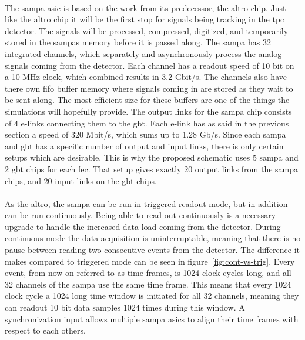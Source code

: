 \documentclass[a4paper]{report}
\begin{document}
\paragraph{}
The \gls{sampa} \gls{asic} is based on the work from its predecessor, the \gls{altro} chip.
Just like the \gls{altro} chip it will be the first stop for signals being tracking in the \gls{tpc} detector.
The signals will be processed, compressed, digitized, and temporarily stored in the \glspl{sampa} memory before it is passed along.
The \gls{sampa} has 32 integrated channels, which separately and asynchronously process the analog signals coming from the detector.\cite{tdr-016}
Each channel has a readout speed of 10 bit on a 10 MHz clock, which combined results in 3.2 Gbit/s.
The channels also have there own \gls{fifo} buffer memory where signals coming in are stored as they wait to be sent along.
The most efficient size for these buffers are one of the things the simulations will hopefully provide.
The output links for the \gls{sampa} chip consists of 4 e-links connecting them to the \gls{gbt}.
Each e-link has as said in the previous section a speed of 320 Mbit/s, which sums up to 1.28 Gb/s.\cite{tdr-015}
Since each \gls{sampa} and \gls{gbt} has a specific number of output and input links, there is only certain setups which are desirable.
This is why the proposed schematic uses 5 \gls{sampa} and 2 \gls{gbt} chips for each \gls{fec}.
That setup gives exactly 20 output links from the \gls{sampa} chips, and 20 input links on the \gls{gbt} chips.

\paragraph{}
As the \gls{altro}, the \gls{sampa} can be run in triggered readout mode, but in addition can be run continuously.
Being able to read out continuously is a necessary upgrade to handle the increased data load coming from the detector.
During continuous mode the data acquisition is uninterruptable, meaning that there is no pause between reading two consecutive events from the detector.
The difference it makes compared to triggered mode can be seen in figure~\ref{fig:cont-vs-trig}.
Every event, from now on referred to as time frames, is 1024 clock cycles long, and all 32 channels of the \gls{sampa} use the same time frame.
This means that every 1024 clock cycle a 1024 long time window is initiated for all 32 channels, meaning they can readout 10 bit data samples 1024 times during this window.
A synchronization input allows multiple \gls{sampa} \gls{asic}s to align their time frames with respect to each others.\cite{tdr-015}
\end{document}
